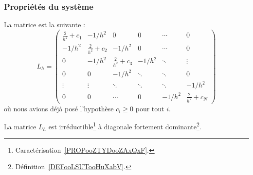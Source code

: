 

\subsubsection{Propriétés du système}

La matrice est la suivante :
\begin{equation}
	L_h=\begin{pmatrix}
		\frac{ 2 }{ h^2 }+c_1 & -1/h^2                & 0                     & 0      & \cdots & 0                     \\
		-1/h^2                & \frac{ 2 }{ h^2 }+c_2 & -1/h^2                & 0      & \cdots & 0                     \\
		0                     & -1/h^2                & \frac{ 2 }{ h^2 }+c_3 & -1/h^2 & \ddots & \vdots                \\
		0                     & 0                     & -1/h^2                & \ddots & \ddots & 0                     \\
		\vdots                & \vdots                & \ddots                & \ddots & \ddots & -1/h^2                \\
		0                     & 0                     & \cdots                & 0      & -1/h^2 & \frac{ 2 }{ h^2 }+c_N
	\end{pmatrix}
\end{equation}
où nous avions déjà posé l'hypothèse \( c_i\geq 0\) pour tout \( i\).

\begin{lemma}       \label{LEMooGGHQooNnVsuu}
	La matrice \( L_h\) est irréductible\footnote{Caractérisation~\ref{PROPooZTYDooZAxQxF}.} à diagonale fortement dominante\footnote{Définition~\ref{DEFooLSUTooHuXabV}.}.
\end{lemma}

